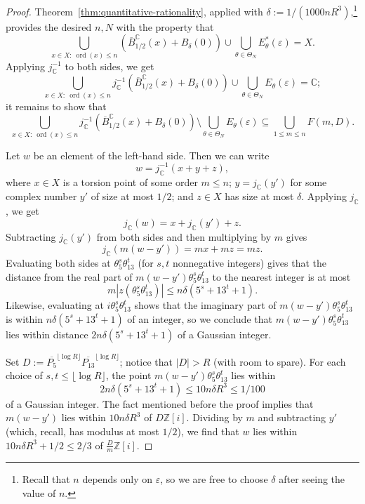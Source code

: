 \documentclass[11pt]{amsart}
\theoremstyle{definition}
\DeclareMathOperator{\ord}{ord}
\begin{document}
\begin{proof}
Theorem~\ref{thm:quantitative-rationality}, applied with $\delta:=1/(1000nR^3)$,\footnote{Recall that $n$ depends only on $\varepsilon$, so we are free to choose $\delta$ after seeing the value of $n$.} provides the desired $n,N$ with the property that
$$\bigcup_{x \in X: ~\ord(x) \leq n} \left(\overline{B}^{\mathbb{C}}_{1/2}(x)+B_{\delta}(0)\right) \cup \bigcup_{\theta \in \Theta_N} E_\theta^*(\varepsilon)=X.$$
Applying $j_{\mathbb{C}}^{-1}$ to both sides, we get
$$\bigcup_{x \in X: ~\ord(x) \leq n} j_{\mathbb{C}}^{-1} \left(\overline{B}^{\mathbb{C}}_{1/2}(x)+B_{\delta}(0)\right) \cup \bigcup_{\theta \in \Theta_N} E_\theta(\varepsilon)=\mathbb{C};$$
it remains to show that
$$\bigcup_{x \in X: ~\ord(x) \leq n} j_{\mathbb{C}}^{-1} \left(\overline{B}^{\mathbb{C}}_{1/2}(x)+B_{\delta}(0)\right) \setminus \bigcup_{\theta \in \Theta_N} E_\theta(\varepsilon) \subseteq \bigcup_{1 \leq m \leq n}F(m,D).$$

Let $w$ be an element of the left-hand side.  Then we can write $$w=j_{\mathbb{C}}^{-1}(x+y+z),$$ where $x \in X$ is a torsion point of some order $m \leq n$; $y=j_{\mathbb{C}}(y')$ for some complex number $y'$ of size at most $1/2$; and $z \in X$ has size at most $\delta$.  Applying $j_{\mathbb{C}}$, we get
$$j_{\mathbb{C}}(w)=x+j_{\mathbb{C}}(y')+z.$$
Subtracting $j_{\mathbb{C}}(y')$ from both sides and then multiplying by $m$ gives
$$j_{\mathbb{C}}(m(w-y'))=mx+mz=mz.$$
Evaluating both sides at $\theta_5^s \theta_{13}^t$ (for $s,t$ nonnegative integers) gives that the distance from the real part of $m(w-y')\theta_5^s \theta_{13}^t$ to the nearest integer is at most
$$m|z(\theta_5^s \theta_{13}^t)|\leq n\delta(5^s+13^t+1).$$
Likewise, evaluating at $i\theta_5^s \theta_{13}^t$ shows that the imaginary part of $m(w-y')\theta_5^s \theta_{13}^t$ is within $n\delta(5^s+13^t+1)$ of an integer, so we conclude that $m(w-y')\theta_5^s \theta_{13}^t$ lies within distance $2n\delta(5^s+13^t+1)$ of a Gaussian integer.

Set $D:=\overline{P_5}^{\lfloor \log R\rfloor} \overline{P_{13}}^{\lfloor \log R\rfloor}$; notice that $|D|>R$ (with room to spare).  For each choice of $s,t \leq \lfloor \log R\rfloor$, the point $m(w-y')\theta_5^s \theta_{13}^t$ lies within $$2n\delta(5^s+13^t+1) \leq 10n\delta R^3\leq 1/100$$ of a Gaussian integer.  The fact mentioned before the proof implies that $m(w-y')$ lies within $10n\delta R^3$ of $D\mathbb{Z}[i]$.  Dividing by $m$ and subtracting $y'$ (which, recall, has modulus at most $1/2$), we find that $w$ lies within $10n\delta R^3+1/2 \leq 2/3$ of $\frac{D}{m}\mathbb{Z}[i]$.


\end{proof}
\end{document}
